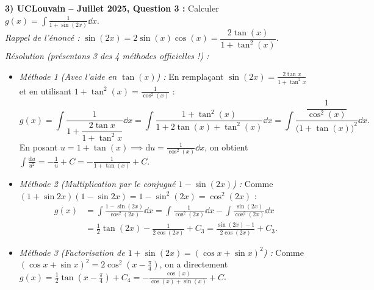 \begin{exemple}
\medskip
\textbf{3) UCLouvain -- Juillet 2025, Question 3 :} Calculer $g(x) = \displaystyle\int \frac{1}{1 + \sin(2x)}\dd x$.\\
\emph{Rappel de l'énoncé :} $\sin(2x) = 2\sin(x)\cos(x) = \dfrac{2\tan(x)}{1 + \tan^2(x)}$.\\
\emph{Résolution (présentons 3 des 4 méthodes officielles !) :}
\begin{itemize}
    \item \emph{Méthode 1 (Avec l'aide en $\tan(x)$) :} En remplaçant $\sin(2x) = \frac{2\tan x}{1+\tan^2 x}$ et en utilisant $1 + \tan^2(x) = \frac{1}{\cos^2(x)}$ :
    \[
        g(x) = \int \frac{1}{1 + \dfrac{2\tan x}{1+\tan^2 x}}\dd x = \int \frac{1 + \tan^2(x)}{1 + 2\tan(x) + \tan^2(x)}\dd x = \int \frac{\dfrac{1}{\cos^2(x)}}{\bigl(1 + \tan(x)\bigr)^2}\dd x.
    \]
    En posant $u = 1 + \tan(x) \implies \mathrm{d}u = \frac{1}{\cos^2(x)}\dd x$, on obtient $\displaystyle\int \frac{\mathrm{d}u}{u^2} = -\frac{1}{u} + C = \boxed{-\frac{1}{1 + \tan(x)} + C}$.
    \item \emph{Méthode 2 (Multiplication par le conjugué $1 - \sin(2x)$) :} Comme $(1+\sin 2x)(1-\sin 2x) = 1 - \sin^2(2x) = \cos^2(2x)$ :
    \begin{align*}
        g(x) &= \int \frac{1 - \sin(2x)}{\cos^2(2x)}\dd x = \int \frac{1}{\cos^2(2x)}\dd x - \int \frac{\sin(2x)}{\cos^2(2x)}\dd x \\
        &= \boxed{\frac{1}{2}\tan(2x) - \frac{1}{2\cos(2x)} + C_3 = \frac{\sin(2x) - 1}{2\cos(2x)} + C_3}.
    \end{align*}
    \item \emph{Méthode 3 (Factorisation de $1 + \sin(2x) = (\cos x + \sin x)^2$) :} Comme $(\cos x + \sin x)^2 = 2\cos^2\left(x - \frac{\pi}{4}\right)$, on a directement $g(x) = \frac{1}{2}\tan\left(x - \frac{\pi}{4}\right) + C_4 = -\frac{\cos(x)}{\cos(x)+\sin(x)} + C$.
\end{itemize}


\end{exemple}
